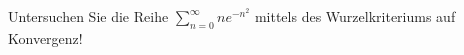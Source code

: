 \item Untersuchen Sie die Reihe $\sum\limits_{n=0}^\infty n e^{-n^2}$ mittels des Wurzelkriteriums auf Konvergenz!